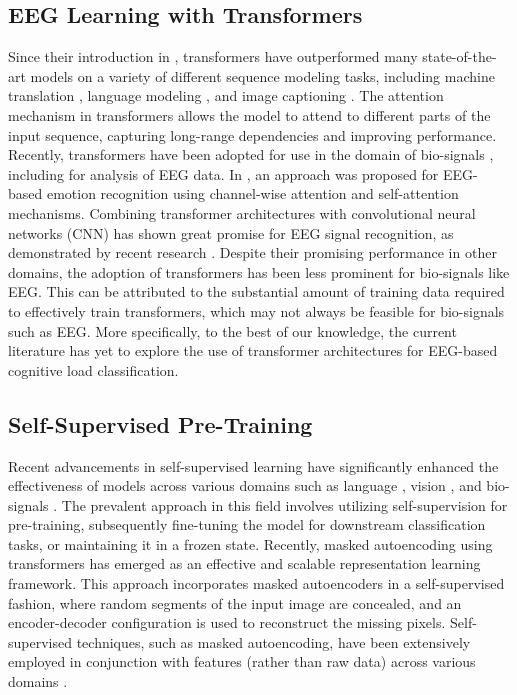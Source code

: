\documentclass[sigconf]{acmart}
\begin{document}
\subsection{EEG Learning with Transformers}
Since their introduction in \cite{vaswani2017attention}, transformers have outperformed many state-of-the-art models on a variety of different sequence modeling tasks, including machine translation \cite{vaswani2017attention,wang2019learning}, language modeling \cite{radford2018improving,devlin2018bert,brown2020language,vaswani2017attention}, and image captioning \cite{anderson2018bottom,xu2015show}. The attention mechanism in transformers allows the model to attend to different parts of the input sequence, capturing long-range dependencies and improving performance.  
Recently, transformers have been adopted for use in the domain of bio-signals \cite{behinaein2021transformer}, including for analysis of EEG data. In \cite{tao2020eeg}, an approach was proposed for EEG-based emotion recognition using channel-wise attention and self-attention mechanisms. Combining transformer architectures with convolutional neural networks (CNN) has shown great promise for EEG signal recognition, as demonstrated by recent research \cite{sun2021eeg}. Despite their promising performance in other domains, the adoption of transformers has been less prominent for bio-signals like EEG. This can be attributed to the substantial amount of training data required to effectively train transformers, which may not always be feasible for bio-signals such as EEG. More specifically, to the best of our knowledge, the current literature has yet to explore the use of transformer architectures for EEG-based cognitive load classification.


\subsection{Self-Supervised Pre-Training}
Recent advancements in self-supervised learning have significantly enhanced the effectiveness of models across various domains such as language \cite{devlin2018bert,brown2020language}, vision \cite{chen2020simple,chen2021exploring}, and bio-signals \cite{sarkar2020self,sarkar2021detection}. The prevalent approach in this field involves utilizing self-supervision for pre-training, subsequently fine-tuning the model for downstream classification tasks, or maintaining it in a frozen state. Recently, masked autoencoding using transformers \cite{he2022masked} has emerged as an effective and scalable representation learning framework. This approach incorporates masked autoencoders in a self-supervised fashion, where random segments of the input image are concealed, and an encoder-decoder configuration is used to reconstruct the missing pixels. Self-supervised techniques, such as masked autoencoding, have been extensively employed in conjunction with features (rather than raw data) across various domains \cite{wei2022masked,yan20233d,jing2020self}.
\end{document}
